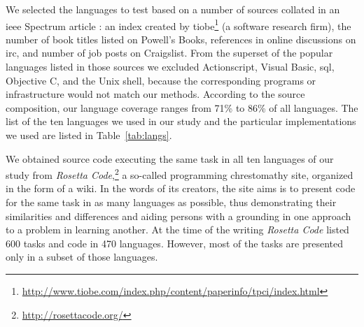 \documentclass[10pt]{sigplanconf}
\begin{document}
We selected the languages to test based on a number of sources
collated in an {\sc ieee} Spectrum article \cite{Kin11}:
an index created by
{\sc tiobe}\footnote{\url{http://www.tiobe.com/index.php/content/paperinfo/tpci/index.html}} (a software research firm),
the number of book titles listed on Powell's Books,
references in online discussions on {\sc irc}, and
number of job posts on Craigslist.
From the superset of the popular languages listed in those
sources we excluded
Actionscript, Visual Basic, {\sc sql}, Objective C, and the Unix shell,
because the corresponding programs or infrastructure would not match our methods.
According to the source composition,
our language coverage ranges from 71\% to 86\% of all languages.
The list of the ten languages we used in our study and the
particular implementations we used are listed in
Table~\ref{tab:langs}.

We obtained source code executing the same task in all ten
languages of our study from
{\em Rosetta Code},\footnote{\url{http://rosettacode.org/}}
a so-called programming chrestomathy site,
organized in the form of a wiki.
In the words of its creators,
the site aims is to present code for the same task in as many languages as possible,
thus demonstrating their similarities and differences and
aiding persons with a grounding in one approach to a problem in learning another.
At the time of the writing {\em Rosetta Code}
listed 600 tasks and code in 470 languages.
However, most of the tasks are presented only in a subset of those languages.
\end{document}
